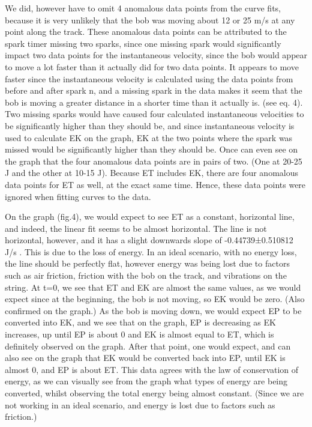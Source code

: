 \documentclass[letterpaper]{article}
\begin{document}
We did, however have to omit 4 anomalous data points from the curve fits, because it is very unlikely that the bob was moving about 12 or 25 m/s at any point along the track. These anomalous data points can be attributed to the spark timer missing two sparks, since one missing spark would significantly impact two data points for the instantaneous velocity, since the bob would appear to move a lot faster than it actually did for two data points. It appears to move faster since the instantaneous velocity is calculated using the data points from before and after spark n, and a missing spark in the data makes it seem that the bob is moving a greater distance in a shorter time than it actually is. (see eq. 4). Two missing sparks would have caused four calculated instantaneous velocities to be significantly higher than they should be, and since instantaneous velocity is used to calculate EK on the graph, EK at the two points where the spark was missed would be significantly higher than they should be. Once can even see on the graph that the four anomalous data points are in pairs of two. (One at 20-25 J and the other at 10-15 J). Because ET includes EK, there are four anomalous data points for ET as well, at the exact same time.  Hence, these data points were ignored when fitting curves to the data.

On the graph (fig.4), we would expect to see ET as a constant, horizontal line, and indeed, the linear fit seems to be almost horizontal. The line is not horizontal, however, and it has a slight downwards slope of -0.44739±0.510812 J/s . This is due to the loss of energy. In an ideal scenario, with no energy loss, the line should be perfectly flat, however energy was being lost due to factors such as air friction, friction with the bob on the track, and vibrations on the string. At t=0, we see that ET and EK are almost the same values, as we would expect since at the beginning, the bob is not moving, so EK would be zero. (Also confirmed on the graph.) As the bob is moving down, we would expect EP to be converted into EK, and we see that on the graph, EP is decreasing as EK increases, up until EP is about 0 and EK is almost equal to ET, which is definitely observed on the graph. After that point, one would expect, and can also see on the graph that EK would be converted back into EP, until EK is almost 0, and EP is about ET. This data agrees with the law of conservation of energy, as we can visually see from the graph what types of energy are being converted, whilst observing the total energy being almost constant. (Since we are not working in an ideal scenario, and energy is lost due to factors such as friction.)
\end{document}
